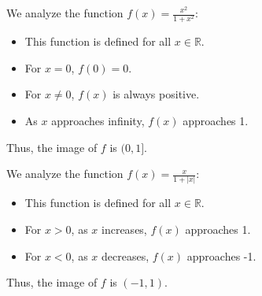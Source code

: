 \begin{solution}
    We analyze the function \( f(x) = \frac{x^2}{1 + x^2} \):
    \begin{itemize}
        \item This function is defined for all \( x \in \mathbb{R} \).
        \item For \( x = 0 \), \( f(0) = 0 \).
        \item For \( x \neq 0 \), \( f(x) \) is always positive.
        \item As \( x \) approaches infinity, \( f(x) \) approaches 1.
    \end{itemize}
    Thus, the image of \( f \) is \( (0, 1] \).
    

    We analyze the function \( f(x) = \frac{x}{1 + |x|} \):
    \begin{itemize}
        \item This function is defined for all \( x \in \mathbb{R} \).
        \item For \( x > 0 \), as \( x \) increases, \( f(x) \) approaches 1.
        \item For \( x < 0 \), as \( x \) decreases, \( f(x) \) approaches -1.
    \end{itemize}
    Thus, the image of \( f \) is \( (-1, 1) \).
    \end{solution}


